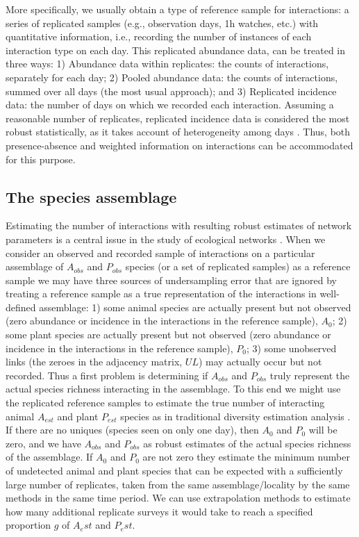 \documentclass[12pt]{article}
\begin{document}
More specifically, we usually obtain a type of reference sample \citep{Chao:2014wm} for interactions: a series of replicated samples (e.g., observation days, 1h watches, etc.) with quantitative information, i.e., recording the number of instances of each interaction type on each day. This replicated abundance data, can be treated in three ways: 1) Abundance data within replicates: the counts of interactions, separately for each day; 2) Pooled abundance data: the counts of interactions, summed over all days (the most usual approach); and 3) Replicated incidence data: the number of days on which we recorded each interaction. Assuming a reasonable number of replicates, replicated incidence data is considered the most robust statistically, as it takes account of heterogeneity among days \citep{Colwell:2004fi,Colwell:2012fc,Chao:2014wm}. Thus, both presence-absence and weighted information on interactions can be accommodated for this purpose. 

\subsection*{The species assemblage}

Estimating the number of interactions with resulting robust estimates of network parameters is a central issue in the study of ecological networks \citep{E31/2562,Bascompte:2014to}. When we consider an observed and recorded sample of interactions on a particular assemblage of $A_{obs}$ and $P_{obs}$ species (or a set of replicated samples) as a reference sample \citep{Chao:2014wm} we may have three sources of undersampling error that are ignored by treating a reference sample as a true representation of the interactions in well-defined assemblage: 1) some animal species are actually present but not observed (zero abundance or incidence in the interactions in the reference sample), $A_0$; 2) some plant species are actually present but not observed (zero abundance or incidence in the interactions in the reference sample), $P_0$; 3) some unobserved links (the zeroes in the adjacency matrix, $UL$) may actually occur but not recorded. Thus a first problem is determining if $A_{obs}$ and $P_{obs}$ truly represent the actual species richness interacting in the assemblage. To this end we might use the replicated reference samples to estimate the true number of interacting animal $A_{est}$ and plant $P_{est}$ species as in traditional diversity estimation analysis \citep{Chao:2014wm}.  If there are no uniques (species seen on only one day), then $A_0$ and $P_0$ will be zero, and we have $A_{obs}$ and $P_{obs}$ as robust estimates of the actual species richness of the assemblage. If $A_0$ and $P_0$ are not zero they estimate the minimum number of undetected animal and plant species that can be expected with a sufficiently large number of replicates, taken from the same assemblage/locality by the same methods in the same time period. We can use extrapolation methods \citep{Colwell:2012fc} to estimate how many additional replicate surveys it would take to reach a specified proportion $g$ of $A_est$ and $P_est$.
\end{document}
